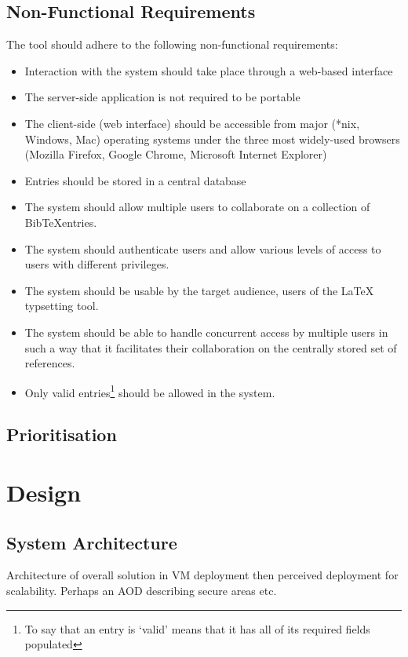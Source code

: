 \documentclass{l4proj}
\newcommand{\BibTeX}{B{\sc ib}\TeX}
\newcommand{\bibtex}{\BibTeX}
\begin{document}
\section{Non-Functional Requirements}
The tool should adhere to the following non-functional requirements:
\begin{itemize}
\item Interaction with the system should take place through a web-based interface
\item The server-side application is not required to be portable
\item The client-side (web interface) should be accessible from major (*nix, Windows, Mac) operating systems under the three most widely-used browsers (Mozilla Firefox, Google Chrome, Microsoft Internet Explorer)
\item Entries should be stored in a central database
\item The system should allow multiple users to collaborate on a collection of \bibtex entries.
\item The system should authenticate users and allow various levels of access to users with different privileges.
\item The system should be usable by the target audience, users of the LaTeX typsetting tool.
\item The system should be able to handle concurrent access by multiple users in such a way that it facilitates their collaboration on the centrally stored set of references.
\item Only valid entries\footnote{To say that an entry is `valid' means that it has all of its required fields populated} should be allowed in the system.
\end{itemize}

\section{Prioritisation}



\chapter{Design}
\label{design}

\section{System Architecture}
Architecture of overall solution in VM deployment then perceived deployment for scalability. Perhaps an AOD describing secure areas etc.
\end{document}
